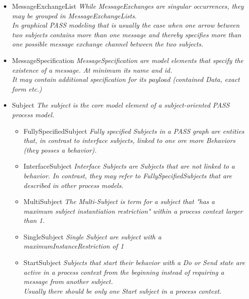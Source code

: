 \begin{itemize}
\begin{itemize}
\begin{itemize}
{		While message exchanges are singular occurrences, they may be grouped in MessageExchangeLists}
		\item MessageExchangeList \linebreak \textit{While MessageExchanges are singular occurrences, they may be grouped in MessageExchangeLists.\\
		In graphical PASS modeling that is usually the case when one arrow between two subjects contains more than one message and thereby specifies more than one possible message exchange channel between the two subjects.}
		\item MessageSpecification \linebreak \textit{MessageSpecification are model elements that specify the existence of a message. At minimum its name and id.\\It may contain additional specification for its payload (contained Data, exact form etc.)}
		\item Subject \linebreak \textit{The subject is the core model element of a subject-oriented PASS process model.}
		\begin{itemize}
			\item FullySpecifiedSubject \linebreak \textit{Fully specified Subjects in a PASS graph are entities that, in contrast to interface subjects, linked to one ore more Behaviors (they posses a behavior).}
			\item InterfaceSubject \linebreak \textit{Interface Subjects are Subjects that are not linked to a behavior. In contrast, they may refer to FullySpecifiedSubjects that are described in other process models.}
			\item MultiSubject \linebreak \textit{The Multi-Subject is term for a subject that "has a maximum subject instantiation restriction" within a process context larger than 1.}
			\item SingleSubject \linebreak \textit{Single Subject are subject with a maximumInstanceRestriction of 1}
			\item StartSubject \linebreak \textit{Subjects that start their behavior with a Do or Send state are active in a process context from the beginning instead of requiring a message from another subject.\\
			Usually there should be only one Start subject in a process context.}
		\end{itemize}
	\end{itemize}
				

\end{itemize}
\end{itemize}
